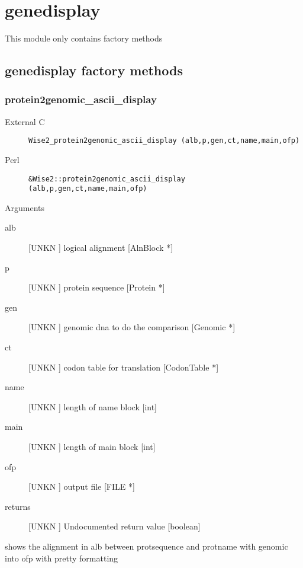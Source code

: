 \section{genedisplay}
\label{module_genedisplay}
This module only contains factory methods

\subsection{genedisplay factory methods}
\subsubsection{protein2genomic_ascii_display}
\begin{description}
\item[External C] {\tt Wise2_protein2genomic_ascii_display (alb,p,gen,ct,name,main,ofp)}
\item[Perl] {\tt &Wise2::protein2genomic_ascii_display (alb,p,gen,ct,name,main,ofp)}

\end{description}
Arguments
\begin{description}
\item[alb] [UNKN ] logical alignment [AlnBlock *]
\item[p] [UNKN ] protein sequence [Protein *]
\item[gen] [UNKN ] genomic dna to do the comparison [Genomic *]
\item[ct] [UNKN ] codon table for translation [CodonTable *]
\item[name] [UNKN ] length of name block [int]
\item[main] [UNKN ] length of main block [int]
\item[ofp] [UNKN ] output file [FILE *]
\item[returns] [UNKN ] Undocumented return value [boolean]
\end{description}
shows the alignment in alb between protsequence and protname
with genomic into ofp with pretty formatting


